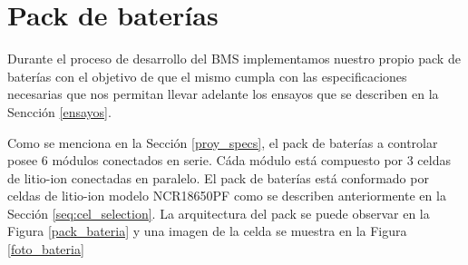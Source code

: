\documentclass[10pt, a4paper]{report}
\begin{document}
\section{Pack de bater\'ias}\label{battery_pack}

Durante el proceso de desarrollo del \acrshort{BMS} implementamos nuestro propio
pack de baterías con el objetivo de que el mismo cumpla con las especificaciones
necesarias que nos permitan llevar adelante los ensayos que se describen en la
Sencción \ref{ensayos}.

Como se menciona en la Secci\'on \ref{proy_specs}, el pack de bater\'ias a
controlar posee 6 m\'odulos conectados en serie. Cáda módulo est\'a compuesto
por 3 celdas de litio-ion conectadas en paralelo. El pack de bater\'ias est\'a
conformado por celdas de litio-ion modelo NCR18650PF como se describen
anteriormente en la Sección \ref{seq:cel_selection}. La arquitectura del pack se
puede observar en la Figura \ref{pack_bateria} y una imagen de la celda se
muestra en la Figura \ref{foto_bateria}
\end{document}
